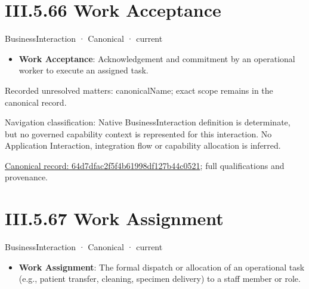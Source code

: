 \section*{III.5.66 Work Acceptance}
\label{navigation:III.5.66}

\label{element:64d7dfac2f5f4b61998df127b44c0521}
{\small BusinessInteraction · Canonical · current}\par

\begin{itemize}


\item \textbf{Work Acceptance}: Acknowledgement and commitment by an operational worker to execute an assigned task.

\end{itemize}

{\small Recorded unresolved matters: canonicalName; exact scope remains in the canonical record.}\par
{\small Navigation classification: Native BusinessInteraction definition is determinate, but no governed capability context is represented for this interaction. No Application Interaction, integration flow or capability allocation is inferred.}\par
{\footnotesize \href{../../../../../../../continuum/business/business-interaction/64d7dfac2f5f4b61998df127b44c0521.md}{Canonical record: 64d7dfac2f5f4b61998df127b44c0521}; full qualifications and provenance.}\par
\section*{III.5.67 Work Assignment}
\label{navigation:III.5.67}

\label{element:c5611769a52d44aebeef55bd48e1f433}
{\small BusinessInteraction · Canonical · current}\par

\begin{itemize}


\item \textbf{Work Assignment}: The formal dispatch or allocation of an operational task (e.g., patient transfer, cleaning, specimen delivery) to a staff member or role.

\end{itemize}

